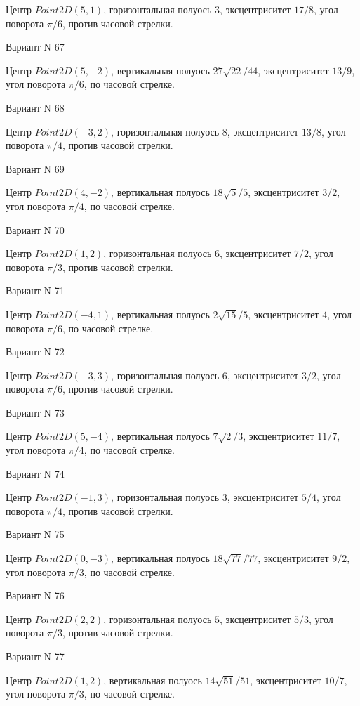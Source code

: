 \documentclass[11pt]{report}
\begin{document}
Центр $Point2D\left(5, 1\right)$, горизонтальная полуось $3$, эксцентриситет $17 / 8$, угол поворота $\pi / 6$, против часовой стрелки.

Вариант N 67

Центр $Point2D\left(5, -2\right)$, вертикальная полуось $27 \sqrt{22} / 44$, эксцентриситет $13 / 9$, угол поворота $\pi / 6$, по часовой стрелке.

Вариант N 68

Центр $Point2D\left(-3, 2\right)$, горизонтальная полуось $8$, эксцентриситет $13 / 8$, угол поворота $\pi / 4$, против часовой стрелки.

Вариант N 69

Центр $Point2D\left(4, -2\right)$, вертикальная полуось $18 \sqrt{5} / 5$, эксцентриситет $3 / 2$, угол поворота $\pi / 4$, по часовой стрелке.

Вариант N 70

Центр $Point2D\left(1, 2\right)$, горизонтальная полуось $6$, эксцентриситет $7 / 2$, угол поворота $\pi / 3$, против часовой стрелки.

Вариант N 71

Центр $Point2D\left(-4, 1\right)$, вертикальная полуось $2 \sqrt{15} / 5$, эксцентриситет $4$, угол поворота $\pi / 6$, по часовой стрелке.

Вариант N 72

Центр $Point2D\left(-3, 3\right)$, горизонтальная полуось $6$, эксцентриситет $3 / 2$, угол поворота $\pi / 6$, против часовой стрелки.

Вариант N 73

Центр $Point2D\left(5, -4\right)$, вертикальная полуось $7 \sqrt{2} / 3$, эксцентриситет $11 / 7$, угол поворота $\pi / 4$, по часовой стрелке.

Вариант N 74

Центр $Point2D\left(-1, 3\right)$, горизонтальная полуось $3$, эксцентриситет $5 / 4$, угол поворота $\pi / 4$, против часовой стрелки.

Вариант N 75

Центр $Point2D\left(0, -3\right)$, вертикальная полуось $18 \sqrt{77} / 77$, эксцентриситет $9 / 2$, угол поворота $\pi / 3$, по часовой стрелке.

Вариант N 76

Центр $Point2D\left(2, 2\right)$, горизонтальная полуось $5$, эксцентриситет $5 / 3$, угол поворота $\pi / 3$, против часовой стрелки.

Вариант N 77

Центр $Point2D\left(1, 2\right)$, вертикальная полуось $14 \sqrt{51} / 51$, эксцентриситет $10 / 7$, угол поворота $\pi / 3$, по часовой стрелке.
\end{document}
